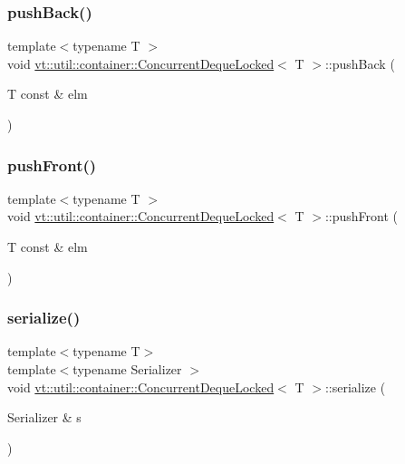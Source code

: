 \subsubsection{\texorpdfstring{push\+Back()}{pushBack()}}
{\footnotesize\ttfamily template$<$typename T $>$ \\
void \hyperlink{structvt_1_1util_1_1container_1_1_concurrent_deque_locked}{vt\+::util\+::container\+::\+Concurrent\+Deque\+Locked}$<$ T $>$\+::push\+Back (\begin{DoxyParamCaption}\item[{T const \&}]{elm }\end{DoxyParamCaption})}

\mbox{\label{structvt_1_1util_1_1container_1_1_concurrent_deque_locked_a5bfd4d329adde2c68c2c1cbc13f98ff4}} 
\subsubsection{\texorpdfstring{push\+Front()}{pushFront()}}
{\footnotesize\ttfamily template$<$typename T $>$ \\
void \hyperlink{structvt_1_1util_1_1container_1_1_concurrent_deque_locked}{vt\+::util\+::container\+::\+Concurrent\+Deque\+Locked}$<$ T $>$\+::push\+Front (\begin{DoxyParamCaption}\item[{T const \&}]{elm }\end{DoxyParamCaption})}

\mbox{\label{structvt_1_1util_1_1container_1_1_concurrent_deque_locked_ae3ae8e15fea25fab5f96d3e388aa46d5}} 
\subsubsection{\texorpdfstring{serialize()}{serialize()}}
{\footnotesize\ttfamily template$<$typename T$>$ \\
template$<$typename Serializer $>$ \\
void \hyperlink{structvt_1_1util_1_1container_1_1_concurrent_deque_locked}{vt\+::util\+::container\+::\+Concurrent\+Deque\+Locked}$<$ T $>$\+::serialize (\begin{DoxyParamCaption}\item[{Serializer \&}]{s }\end{DoxyParamCaption})\hspace{0.3cm}{\ttfamily [inline]}}


